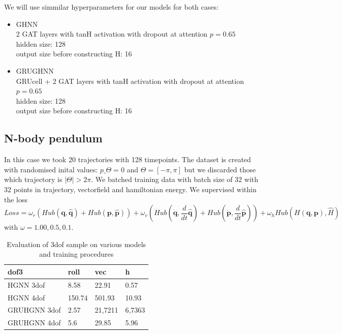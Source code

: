 We will use simmilar hyperparameters for our models for both cases:
\begin{itemize}
	\item GHNN\\ 
	2 GAT layers with tanH activation with dropout at attention $p=0.65$\\
	hidden size: 128\\
	output size before constructing H: 16
	\item GRUGHNN\\ 
	GRUcell + 2 GAT layers with tanH activation with dropout at attention $p=0.65$\\
	hidden size: 128\\
	output size before constructing H: 16
\end{itemize}

\subsection{N-body pendulum}
In this case we took 20 trajectories with 128 timepoints. The dataset is created with randomised inital values: $p\_{\Theta} = 0$ and $\Theta =[-\pi,\pi]$ but we discarded those which trajectory is $|\Theta|>2\pi$. We batched training data with batch size of 32 with 32 points in trajectory, vectorfield and hamiltonian energy. We supervised within the loss
\begin{equation}
	Loss =  \omega_r(Hub({\mathbf{q}},\hat{\mathbf{q}}) + Hub({\mathbf{p}},\hat{\mathbf{p}})) +
	\omega_v(Hub(\dot{\mathbf{q}},\frac{d}{dt}\hat{\mathbf{q}}) + Hub(\dot{\mathbf{p}},\frac{d}{dt}\hat{\mathbf{p}})) +
	\omega_h Hub(H(\mathbf{q},\mathbf{p}),\hat{H}) 
\end{equation} with $\omega ={1.00,0.5,0.1}$.
\begin{table}[h!]
	\centering
	\caption{Evaluation of 3dof sample on various models and training procedures} %
	\label{tab:my_label}               %
	\begin{tabular}{|l|l|l|l|}
		\hline
		dof3 & roll & vec & h\\ 
		\hline
		HGNN 3dof & 8.58 & 22.91 & 0.57 \\  
		\hline
		HGNN 4dof & 150.74 & 501.93 & 10.93 \\  
		\hline
		GRUHGNN 3dof & 2.57 & 21,7211 & 6,7363 \\  
		\hline
		GRUHGNN 4dof & 5.6 & 29.85 & 5.96 \\  
		\hline
	\end{tabular}
\end{table}
